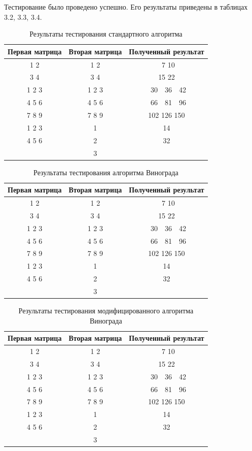 Тестирование было проведено успешно. Его результаты приведены в таблицах 3.2, 3.3, 3.4.
\begin{table}[H]
    \caption{Результаты тестирования стандартного алгоритма}
    \centering
    \begin{tabular}{|c|c|c|}
        \hline
        Первая матрица & Вторая матрица & Полученный результат \\
        \hline
        1 2 & 1 2 & \ 7 10 \\
        3 4 & 3 4 & 15 22 \\
        \hline
        1 2 3 & 1 2 3 & \ 30\ \ 36\ \ 42 \\
        4 5 6 & 4 5 6 & \ 66\ \ 81\ \ 96 \\
        7 8 9 & 7 8 9 & 102 126 150 \\
        \hline
        1 2 3 & 1 & 14 \\
        4 5 6 & 2 & 32 \\
              & 3 & \\
        \hline
    \end{tabular}
\end{table}
\begin{table}[H]
    \caption{Результаты тестирования алгоритма Винограда}
    \centering
    \begin{tabular}{|c|c|c|}
        \hline
        Первая матрица & Вторая матрица & Полученный результат \\
        \hline
        1 2 & 1 2 & \ 7 10 \\
        3 4 & 3 4 & 15 22 \\
        \hline
        1 2 3 & 1 2 3 & \ 30\ \ 36\ \ 42 \\
        4 5 6 & 4 5 6 & \ 66\ \ 81\ \ 96 \\
        7 8 9 & 7 8 9 & 102 126 150 \\
        \hline
        1 2 3 & 1 & 14 \\
        4 5 6 & 2 & 32 \\
              & 3 & \\
        \hline
    \end{tabular}
\end{table}
\begin{table}[H]
    \caption{Результаты тестирования модифицированного алгоритма Винограда}
    \centering
    \begin{tabular}{|c|c|c|}
        \hline
        Первая матрица & Вторая матрица & Полученный результат \\
        \hline
        1 2 & 1 2 & \ 7 10 \\
        3 4 & 3 4 & 15 22 \\
        \hline
        1 2 3 & 1 2 3 & \ 30\ \ 36\ \ 42 \\
        4 5 6 & 4 5 6 & \ 66\ \ 81\ \ 96 \\
        7 8 9 & 7 8 9 & 102 126 150 \\
        \hline
        1 2 3 & 1 & 14 \\
        4 5 6 & 2 & 32 \\
              & 3 & \\
        \hline
    \end{tabular}
\end{table}



